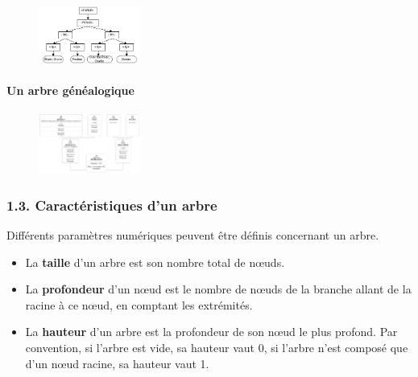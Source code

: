 \documentclass[
  a4paper,
  DIV=11,
  numbers=noendperiod]{scrartcl}
\let\oldparagraph\paragraph
\renewcommand{\paragraph}[1]{\oldparagraph{#1}\mbox{}}
\providecommand{\tightlist}{%
  \setlength{\itemsep}{0pt}\setlength{\parskip}{0pt}}\usepackage{longtable,booktabs,array}
\begin{document}
\begin{figure}

{\centering \includegraphics[width=0.3\textwidth,height=\textheight]{DOM.png}

}

\end{figure}

\hypertarget{un-arbre-guxe9nuxe9alogique}{%
\paragraph{Un arbre généalogique}\label{un-arbre-guxe9nuxe9alogique}}

\begin{figure}

{\centering \includegraphics[width=0.3\textwidth,height=\textheight]{arbre_genea.png}

}

\end{figure}

\hypertarget{caractuxe9ristiques-dun-arbre}{%
\subsubsection{1.3. Caractéristiques d'un
arbre}\label{caractuxe9ristiques-dun-arbre}}

Différents paramètres numériques peuvent être définis concernant un
arbre.

\begin{tcolorbox}[enhanced jigsaw, opacitybacktitle=0.6, title=\textcolor{quarto-callout-tip-color}{\faLightbulb}\hspace{0.5em}{Définitions}, coltitle=black, left=2mm, breakable, opacityback=0, bottomtitle=1mm, colback=white, leftrule=.75mm, rightrule=.15mm, bottomrule=.15mm, titlerule=0mm, arc=.35mm, colbacktitle=quarto-callout-tip-color!10!white, toprule=.15mm, toptitle=1mm]

\begin{itemize}
\tightlist
\item
  La \textbf{taille} d'un arbre est son nombre total de nœuds.
\item
  La \textbf{profondeur} d'un nœud est le nombre de nœuds de la branche
  allant de la racine à ce nœud, en comptant les extrémités.
\item
  La \textbf{hauteur} d'un arbre est la profondeur de son nœud le plus
  profond. Par convention, si l'arbre est vide, sa hauteur vaut 0, si
  l'arbre n'est composé que d'un nœud racine, sa hauteur vaut 1.
\end{itemize}

\end{tcolorbox}
\end{document}
